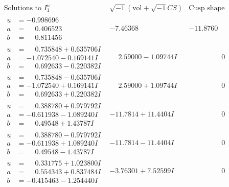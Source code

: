\documentclass[1p]{elsarticle_modified}
\theoremstyle{definition}
\newcommand{\I}{\sqrt{-1}}
\begin{document}
$$\begin{array}{c|c|c}  
\text{Solutions to }I^u_{1}& \I (\text{vol} + \sqrt{-1}CS) & \text{Cusp shape}\\
 \hline 
\begin{aligned}
u &= -0.998696\phantom{ +0.000000I} \\
a &= \phantom{-}0.406523\phantom{ +0.000000I} \\
b &= \phantom{-}0.811456\phantom{ +0.000000I}\end{aligned}
 & -7.46368\phantom{ +0.000000I} & -11.8760\phantom{ +0.000000I} \\ \hline\begin{aligned}
u &= \phantom{-}0.735848 + 0.635706 I \\
a &= -1.072540 - 0.169141 I \\
b &= \phantom{-}0.692633 - 0.220382 I\end{aligned}
 & \phantom{-}2.59000 - 1.09744 I & \phantom{-0.000000 } 0 \\ \hline\begin{aligned}
u &= \phantom{-}0.735848 - 0.635706 I \\
a &= -1.072540 + 0.169141 I \\
b &= \phantom{-}0.692633 + 0.220382 I\end{aligned}
 & \phantom{-}2.59000 + 1.09744 I & \phantom{-0.000000 } 0 \\ \hline\begin{aligned}
u &= \phantom{-}0.388780 + 0.979792 I \\
a &= -0.611938 - 1.089240 I \\
b &= \phantom{-}0.49548 + 1.43787 I\end{aligned}
 & -11.7814 + 11.4404 I & \phantom{-0.000000 } 0 \\ \hline\begin{aligned}
u &= \phantom{-}0.388780 - 0.979792 I \\
a &= -0.611938 + 1.089240 I \\
b &= \phantom{-}0.49548 - 1.43787 I\end{aligned}
 & -11.7814 - 11.4404 I & \phantom{-0.000000 } 0 \\ \hline\begin{aligned}
u &= \phantom{-}0.331775 + 1.023800 I \\
a &= \phantom{-}0.554343 + 0.837484 I \\
b &= -0.415463 - 1.254440 I\end{aligned}
 & -3.76301 + 7.52599 I & \phantom{-0.000000 } 0 \\ \hline\begin{aligned}

\end{aligned}
\end{array}$$
\end{document}
